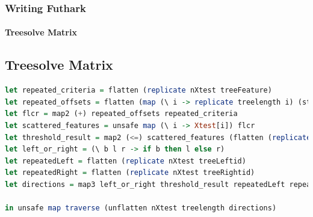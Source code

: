 \documentclass[12pt,t]{beamer}
\begin{document}
\begin{frame}[fragile]
  \frametitle{Writing Futhark}
  \framesubtitle{Treesolve Matrix}
\subsection{Treesolve Matrix}
\begin{minipage}{\textwidth}
\begin{lstlisting}[basicstyle=\tiny, language=Haskell, breaklines]
let repeated_criteria = flatten (replicate nXtest treeFeature)
let repeated_offsets = flatten (map (\ i -> replicate treelength i) (steps 0 nXtest dXtest))
let flcr = map2 (+) repeated_offsets repeated_criteria
let scattered_features = unsafe map (\ i -> Xtest[i]) flcr
let threshold_result = map2 (<=) scattered_features (flatten (replicate nXtest treeThres_or_leaf))
let left_or_right = (\ b l r -> if b then l else r)
let repeatedLeft = flatten (replicate nXtest treeLeftid)
let repeatedRight = flatten (replicate nXtest treeRightid)
let directions = map3 left_or_right threshold_result repeatedLeft repeatedRight

in unsafe map traverse (unflatten nXtest treelength directions)
\end{lstlisting}
\end{minipage}

%
%

\colorbox{lightgray}{\usebox\lstboxfive}

\end{frame}
\end{document}
